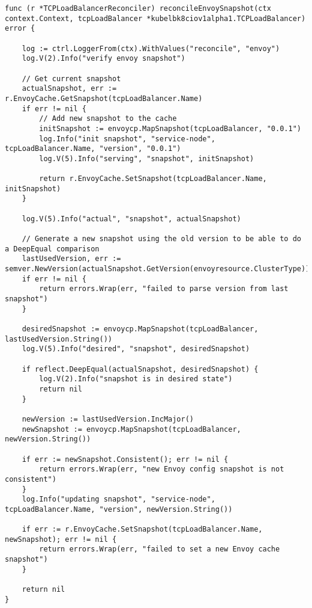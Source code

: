 \begin{lstlisting}[caption={Envoy snapshot reconciliation}, label={lst:snapshot-reconcile}]
func (r *TCPLoadBalancerReconciler) reconcileEnvoySnapshot(ctx context.Context, tcpLoadBalancer *kubelbk8ciov1alpha1.TCPLoadBalancer) error {

	log := ctrl.LoggerFrom(ctx).WithValues("reconcile", "envoy")
	log.V(2).Info("verify envoy snapshot")

	// Get current snapshot
	actualSnapshot, err := r.EnvoyCache.GetSnapshot(tcpLoadBalancer.Name)
	if err != nil {
		// Add new snapshot to the cache
		initSnapshot := envoycp.MapSnapshot(tcpLoadBalancer, "0.0.1")
		log.Info("init snapshot", "service-node", tcpLoadBalancer.Name, "version", "0.0.1")
		log.V(5).Info("serving", "snapshot", initSnapshot)

		return r.EnvoyCache.SetSnapshot(tcpLoadBalancer.Name, initSnapshot)
	}

	log.V(5).Info("actual", "snapshot", actualSnapshot)

	// Generate a new snapshot using the old version to be able to do a DeepEqual comparison
	lastUsedVersion, err := semver.NewVersion(actualSnapshot.GetVersion(envoyresource.ClusterType))
	if err != nil {
		return errors.Wrap(err, "failed to parse version from last snapshot")
	}

	desiredSnapshot := envoycp.MapSnapshot(tcpLoadBalancer, lastUsedVersion.String())
	log.V(5).Info("desired", "snapshot", desiredSnapshot)

	if reflect.DeepEqual(actualSnapshot, desiredSnapshot) {
		log.V(2).Info("snapshot is in desired state")
		return nil
	}

	newVersion := lastUsedVersion.IncMajor()
	newSnapshot := envoycp.MapSnapshot(tcpLoadBalancer, newVersion.String())

	if err := newSnapshot.Consistent(); err != nil {
		return errors.Wrap(err, "new Envoy config snapshot is not consistent")
	}
	log.Info("updating snapshot", "service-node", tcpLoadBalancer.Name, "version", newVersion.String())

	if err := r.EnvoyCache.SetSnapshot(tcpLoadBalancer.Name, newSnapshot); err != nil {
		return errors.Wrap(err, "failed to set a new Envoy cache snapshot")
	}

	return nil
}
\end{lstlisting}
